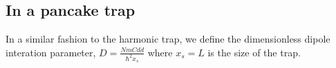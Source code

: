 \documentclass[10pt]{article}
\begin{document}
\begin{multicols}{2}
\subsection{In a pancake trap}

 In a similar fashion to the harmonic trap, we define the dimensionless dipole interation parameter, $D=\frac{NmCdd}{\hbar^{2}x_{s}}$ where $ x_{s} =L$ is the size of the trap.
 
 
 \end{multicols}




 
\end{document}
